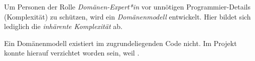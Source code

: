 
Um Personen der  Rolle \textit{Domänen-Expert*in} vor unnötigen Programmier-Details (Komplexität) zu schützen, wird ein \textit{Domänenmodell} entwickelt. Hier bildet sich lediglich die \textit{inhärente Komplexität} ab.


Ein Domänenmodell existiert im zugrundeliegenden Code nicht. Im Projekt konnte hierauf verzichtet worden sein, weil \missing.




